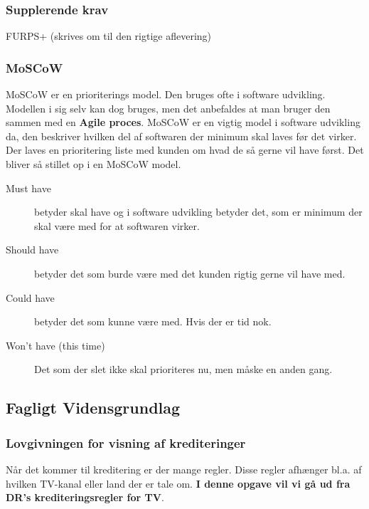 \subsubsection{Supplerende krav} %
FURPS+ (skrives om til den rigtige aflevering)

\subsubsection{MoSCoW} %
MoSCoW er en prioriterings model. Den bruges ofte i software udvikling.\\

\noindent
Modellen i sig selv kan dog bruges, men det anbefaldes at man bruger den sammen med en \textbf{Agile proces}. 
MoSCoW er en vigtig model i software udvikling da, den beskriver hvilken del af softwaren der minimum skal laves før det virker. Der laves en prioritering liste med kunden om hvad de så gerne vil have først. Det bliver så stillet op i en MoSCoW model.

\begin{description}
    \item [Must have] betyder skal have og i software udvikling betyder det, som er minimum der skal være med for at softwaren virker. 
    \item [Should have] betyder det som burde være med det kunden rigtig gerne vil have med.
    \item [Could have] betyder det som kunne være med. Hvis der er tid nok. 
    \item [Won't have (this time)] Det som der slet ikke skal prioriteres nu, men måske en anden gang.
\end{description}

\subsection{Fagligt Vidensgrundlag}

\subsubsection{Lovgivningen for visning af krediteringer}
Når det kommer til kreditering er der mange regler. Disse regler afhænger bl.a. af hvilken TV-kanal eller land der er tale om. \textbf{I denne opgave vil vi gå ud fra DR's krediteringsregler for TV}. \\

